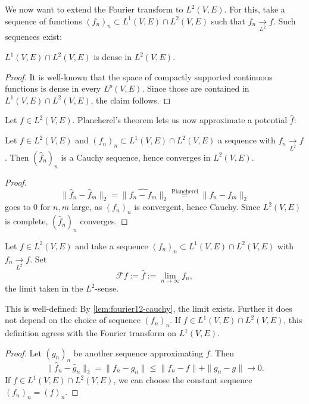 We now want to extend the Fourier transform to $L^2(V,E)$. For this, take a sequence of functions $(f_n)_n\subset L^1(V,E)\cap L^2(V,E)$
such that $f_n\xrightarrow[L^2]{}f$. Such sequences exist:
\begin{lemma}
  \label{lem:L12-dense}
  \lean{}
  $L^1(V,E)\cap L^2(V,E)$ is dense in $L^2(V,E)$.
\end{lemma}
\begin{proof}
  It is well-known that the space of compactly supported continuous functions is dense in every $L^p(V,E)$.
  Since those are contained in $L^1(V,E)\cap L^2(V,E)$, the claim follows.
\end{proof}

Let $f\in L^2(V,E)$. Plancherel's theorem lets us now approximate a potential $\widehat f$:
\begin{lemma}
  \label{lem:fourier12-cauchy}
  \lean{}
  Let $f\in L^2(V,E)$ and $(f_n)_n\subset L^1(V,E)\cap L^2(V,E)$ a sequence with $f_n\xrightarrow[L^2]{}f$. Then $(\widehat f_n)_n$ is a Cauchy sequence,
  hence converges in $L^2(V,E)$.
\end{lemma}
\begin{proof}
  $$\|\widehat f_n-\widehat f_m\|_2=\|\widehat{f_n-f_m}\|_2\overset{\text{Plancherel}}=\|f_n-f_m\|_2$$ goes to $0$ for $n,m$ large, as $(f_n)_n$ is
  convergent, hence Cauchy. Since $L^2(V,E)$ is complete, $(\widehat f_n)_n$ converges.
\end{proof}
\begin{definition}
  \label{def:fourier-L2}
  \lean{}
  Let $f\in L^2(V,E)$ and take a sequence $(f_n)_n\subset L^1(V,E)\cap L^2(V,E)$ with $f_n\xrightarrow[L^2]{}f$. Set
  $$\mathcal Ff:=\widehat f:=\lim_{n\to\infty}\widehat{f_n},$$ the limit taken in the $L^2$-sense.
\end{definition}
\begin{lemma}
  \label{lem:fourier2-welldef}
  \lean{}
  This is well-defined: By \ref{lem:fourier12-cauchy}, the limit exists. Further it does not depend
  on the choice of sequence $(f_n)_n$. If $f\in L^1(V,E)\cap L^2(V,E)$, this definition agrees with
  the Fourier transform on $L^1(V,E)$.
\end{lemma}
\begin{proof}
  Let $(g_n)_n$ be another sequence approximating $f$. Then
  $$\|\widehat f_n-\widehat g_n\|_2=\|f_n-g_n\|\leq\|f_n-f\|+\|g_n-g\|\to0.$$
  If $f\in L^1(V,E)\cap L^2(V,E)$, we can choose the constant sequence $(f_n)_n=(f)_n$.
\end{proof}

